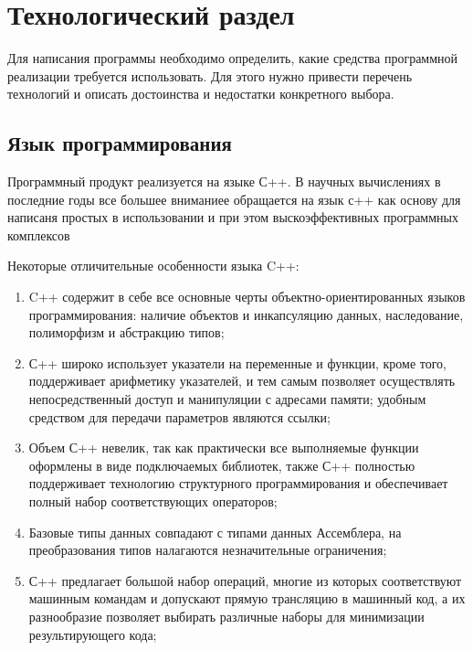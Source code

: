 \section{Технологический раздел}
Для написания программы необходимо определить, какие средства программной реализации требуется использовать. 
Для этого нужно привести перечень технологий и описать достоинства и недостатки конкретного выбора.

\subsection{Язык программирования}
Программный продукт реализуется на языке С++.
В научных вычислениях в последние годы все большее вниманиее обращается на язык с++ как основу для написаня простых в использовании и при этом выскоэффективных программных комплексов

Некоторые отличительные особенности языка C++:
\begin{enumerate}
	\item C++ содержит в себе все основные черты объектно-ориентированных языков программирования: наличие объектов и инкапсуляцию данных, наследование, полиморфизм и абстракцию типов;
	\item С++ широко использует указатели на переменные и функции, кроме того, поддерживает арифметику указателей, и тем самым позволяет осуществлять непосредственный доступ и манипуляции с адресами памяти; удобным средством для передачи параметров являются ссылки;
	\item Объем С++ невелик, так как практически все выполняемые функции оформлены в виде подключаемых библиотек, также С++ полностью поддерживает технологию структурного программирования и обеспечивает полный набор соответствующих операторов;
	\item Базовые типы данных совпадают с типами данных Ассемблера, на преобразования типов налагаются незначительные ограничения;
	\item С++ предлагает большой набор операций, многие из которых соответствуют машинным командам и допускают прямую трансляцию в машинный код, а их разнообразие позволяет выбирать различные наборы для минимизации результирующего кода;
\end{enumerate}

